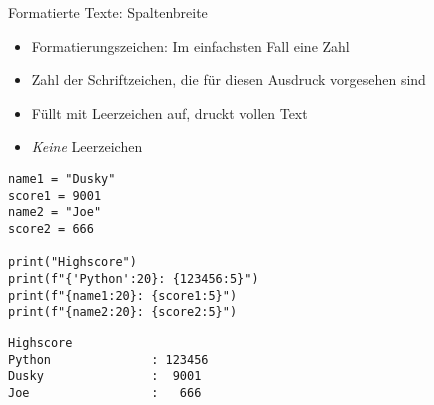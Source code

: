 
\begin{frame}[fragile]{Formatierte Texte: Spaltenbreite}
%
\begin{itemize}
\item Formatierungszeichen: Im einfachsten Fall eine Zahl
\item Zahl der Schriftzeichen, die für diesen Ausdruck vorgesehen sind
\item Füllt mit Leerzeichen auf, druckt vollen Text
\item \emph{Keine} Leerzeichen
\end{itemize}
%
\vspace{-10pt}
\begin{minipage}[t]{.49\linewidth}
\phantom{x}
\begin{codebox}
\begin{verbatim}
name1 = "Dusky"
score1 = 9001
name2 = "Joe"
score2 = 666

print("Highscore")
print(f"{'Python':20}: {123456:5}")
print(f"{name1:20}: {score1:5}")
print(f"{name2:20}: {score2:5}")
\end{verbatim}
\end{codebox}
\end{minipage}
%
\begin{minipage}[t]{.49\linewidth}
\phantom{x}
\begin{cmdbox}
\begin{verbatim}
Highscore
Python              : 123456
Dusky               :  9001
Joe                 :   666
\end{verbatim}
\end{cmdbox}
\end{minipage}
%
\end{frame}


